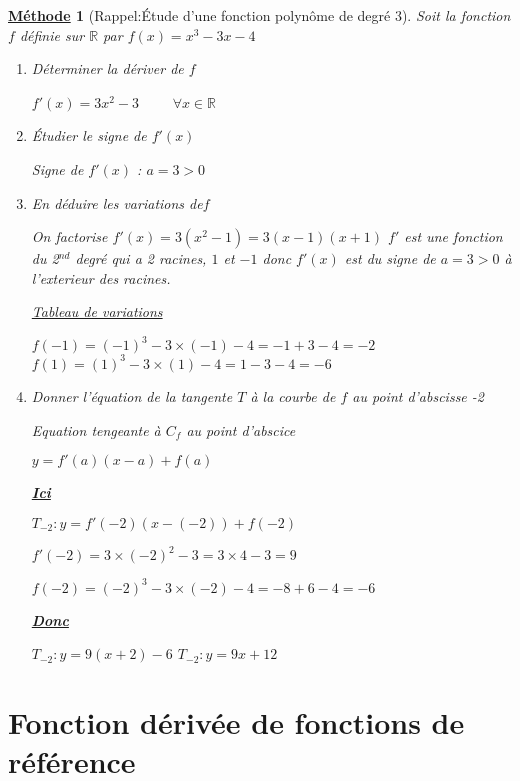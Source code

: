 \documentclass[11pt,a4paper]{article}
\def\R{{\mathbb R}}
\theoremstyle{break}
\newtheorem{Meth}{\underline{Méthode}}
\begin{document}

\begin{Meth}[Rappel:Étude d'une fonction polynôme de degré 3]
Soit la fonction $f$ définie sur $\R$ par $f(x)=x^3-3x-4$
\begin{enumerate}
	\item Déterminer la dériver de $f$ \par
		$f'(x) = 3x^2-3$ ~~~~$\forall x \in \R $ 
	\item Étudier le signe de $f'(x)$ \par
	Signe de $f'(x)$ : $a=3>0$
	\item En déduire les variations de$f$\par
	On factorise $f'(x) = 3(x^2-1) = 3(x-1)(x+1)$
	$f'$ est une fonction du 2$^{nd}$ degré qui a 2 racines, $1$ et $-1$ donc $f'(x)$ est du signe de $a=3>0$ à l'exterieur des racines.\par
		\begin{center}
				\underline{Tableau de variations}

			\setlength{\columnseprule}{0.4pt}
    \end{center}
	$f(-1) = (-1)^3 - 3 \times (-1) - 4 = -1 + 3 - 4 = -2$
	$f(1) = (1)^3 - 3 \times (1) - 4 = 1 - 3 - 4 = -6$
	
	\item Donner l'équation de la tangente $T$ à la courbe de $f$ au point d'abscisse -2 \par
	Equation tengeante à $C_f$ au point d'abscice \par
	$y = f'(a)(x-a)+f(a)$ \par
	\textbf{\underline{Ici}} \par
	$T_{-2}: y = f'(-2)(x-(-2))+f(-2)$\par
	$f'(-2) = 3 \times (-2)^2 - 3 = 3 \times 4 - 3 = 9 $\par
	$f(-2) =  (-2)^3 - 3 \times (-2) -4 = -8 + 6 - 4 = -6 $\par
	\textbf{\underline{Donc}}\par
	 $T_{-2}: y = 9(x+2)-6$
	 $T_{-2}: y = 9x+12$
\end{enumerate}
\end{Meth}
\newpage
\section{Fonction dérivée de fonctions de référence} 
\end{document}
